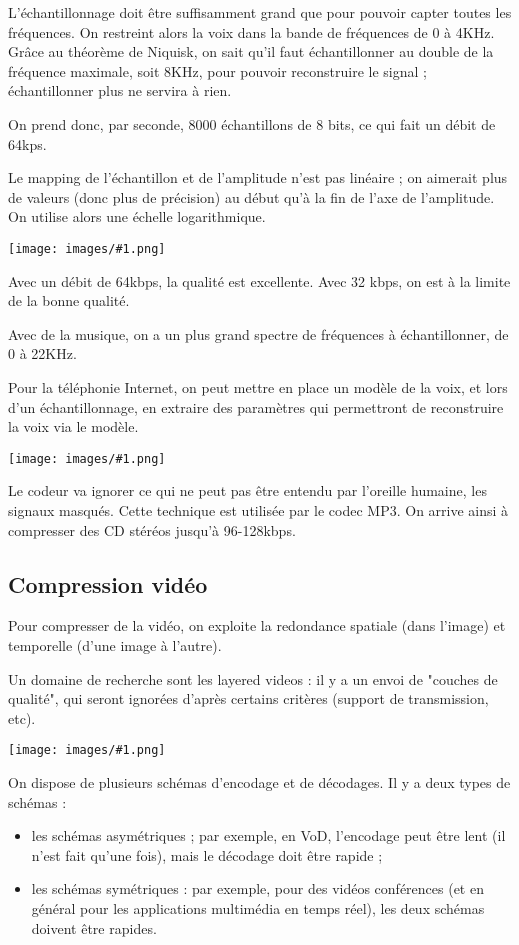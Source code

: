 \documentclass[10pt,a4paper]{report}
\newcommand{\dessin}[1]{\begin{center}\texttt{[image: images/\#1.png]}\end{center}}
\newcommand{\dessinS}[2]{\begin{center}\texttt{[image: images/\#1.png]}\end{center}}
\begin{document}
		L'échantillonnage doit être suffisamment grand que pour pouvoir capter toutes les fréquences. On restreint alors la voix dans la bande de fréquences de 0 à 4KHz. Grâce au théorème de Niquisk, on sait qu'il faut échantillonner au double de la fréquence maximale, soit 8KHz, pour pouvoir reconstruire le signal ; échantillonner plus ne servira à rien.
		
		On prend donc, par seconde, 8000 échantillons de 8 bits, ce qui fait un débit de 64kps.
		
		Le mapping de l'échantillon et de l'amplitude n'est pas linéaire ; on aimerait plus de valeurs (donc plus de précision) au début qu'à la fin de l'axe de l'amplitude. On utilise alors une échelle logarithmique.
		
		\dessin{64}
		
		Avec un débit de 64kbps, la qualité est excellente. Avec 32 kbps, on est à la limite de la bonne qualité.
		
		Avec de la musique, on a un plus grand spectre de fréquences à échantillonner, de 0 à 22KHz.
		
		Pour la téléphonie Internet, on peut mettre en place un modèle de la voix, et lors d'un échantillonnage, en extraire des paramètres qui permettront de reconstruire la voix via le modèle. 
		
		\dessin{65}
		
		Le codeur va ignorer ce qui ne peut pas être entendu par l'oreille humaine, les signaux masqués. Cette technique est utilisée par le codec MP3. On arrive ainsi à compresser des CD stéréos jusqu'à 96-128kbps.
		
		\subsection{Compression vidéo}
		
		Pour compresser de la vidéo, on exploite la redondance spatiale (dans l'image) et temporelle (d'une image à l'autre).
		
		Un domaine de recherche sont les layered videos : il y a un envoi de "couches de qualité", qui seront ignorées d'après certains critères (support de transmission, etc).
		
		\dessinS{66}{.6}
		
		On dispose de plusieurs schémas d'encodage et de décodages. Il y a deux types de schémas :
		
		\begin{itemize}
			\item les schémas asymétriques ; par exemple, en VoD, l'encodage peut être lent (il n'est fait qu'une fois), mais le décodage doit être rapide ;
			\item les schémas symétriques : par exemple, pour des vidéos conférences (et en général pour les applications multimédia en temps réel), les deux schémas doivent être rapides.
		\end{itemize}
		
\end{document}
